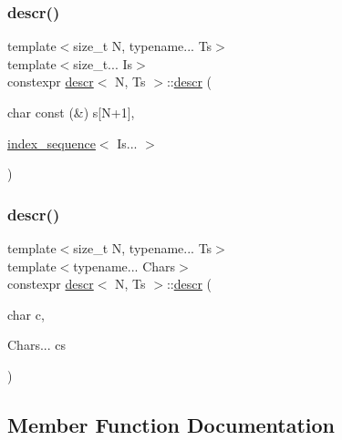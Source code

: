 \subsubsection{\texorpdfstring{descr()}{descr()}\hspace{0.1cm}{\footnotesize\ttfamily [3/4]}}
{\footnotesize\ttfamily template$<$size\+\_\+t N, typename... Ts$>$ \\
template$<$size\+\_\+t... Is$>$ \\
constexpr \mbox{\hyperlink{structdescr}{descr}}$<$ N, Ts $>$\+::\mbox{\hyperlink{structdescr}{descr}} (\begin{DoxyParamCaption}\item[{char const (\&)}]{s\mbox{[}\+N+1\mbox{]},  }\item[{\mbox{\hyperlink{structindex__sequence}{index\+\_\+sequence}}$<$ Is... $>$}]{ }\end{DoxyParamCaption})\hspace{0.3cm}{\ttfamily [inline]}}

\mbox{\label{structdescr_aefea536f4cfdb5f7f0a62940e5c98739}} 
\subsubsection{\texorpdfstring{descr()}{descr()}\hspace{0.1cm}{\footnotesize\ttfamily [4/4]}}
{\footnotesize\ttfamily template$<$size\+\_\+t N, typename... Ts$>$ \\
template$<$typename... Chars$>$ \\
constexpr \mbox{\hyperlink{structdescr}{descr}}$<$ N, Ts $>$\+::\mbox{\hyperlink{structdescr}{descr}} (\begin{DoxyParamCaption}\item[{char}]{c,  }\item[{Chars...}]{cs }\end{DoxyParamCaption})\hspace{0.3cm}{\ttfamily [inline]}}



\subsection{Member Function Documentation}
\mbox{\label{structdescr_aa50422546de62bc8ff59842d849c80a9}} 
